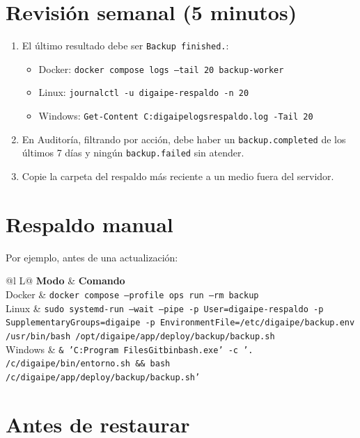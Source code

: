 \section{Revisión semanal (5 minutos)}

\begin{enumerate}
	\item El último resultado debe ser \texttt{Backup finished.}:
	      \begin{itemize}
		      \item Docker: \texttt{docker compose logs --tail 20 backup-worker}
		      \item Linux: \texttt{journalctl -u digaipe-respaldo -n 20}
		      \item Windows: \texttt{Get-Content C:\bs digaipe\bs logs\bs respaldo.log -Tail 20}
	      \end{itemize}
	\item En Auditoría, filtrando por acción, debe haber un \texttt{backup.completed} de los
	      últimos 7 días y ningún \texttt{backup.failed} sin atender.
	\item Copie la carpeta del respaldo más reciente a un medio fuera del servidor.
\end{enumerate}

\section{Respaldo manual}

Por ejemplo, antes de una actualización:

\begin{xltabular}{\linewidth}{@{}l L@{}}
	\toprule
	\textbf{Modo} & \textbf{Comando} \\
	\midrule
	\endhead
	Docker & \texttt{docker compose --profile ops run --rm backup} \\
	Linux & \texttt{sudo systemd-run --wait --pipe -p User=digaipe-respaldo
	-p SupplementaryGroups=digaipe -p EnvironmentFile=/etc/digaipe/backup.env
	/usr/bin/bash /opt/digaipe/app/deploy/backup/backup.sh} \\
	Windows & \texttt{\& 'C:\bs Program Files\bs Git\bs bin\bs bash.exe' -c '. /c/digaipe/bin/entorno.sh
	\&\& bash /c/digaipe/app/deploy/backup/backup.sh'} \\
	\bottomrule
\end{xltabular}

\section{Antes de restaurar}


